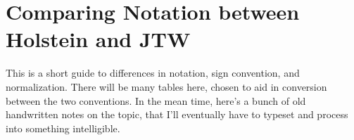 %
%
%




\section{Comparing Notation between Holstein and JTW}
	This is a short guide to differences in notation, sign convention, and normalization.  There will be many tables here, chosen to aid in conversion between the two conventions.  In the mean time, here's a bunch of old handwritten notes on the topic, that I'll eventually have to typeset and process into something intelligible.  
	
	

